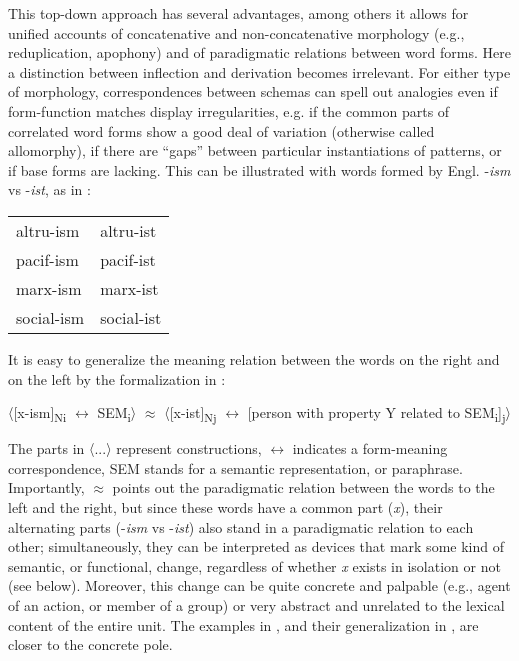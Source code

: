 \documentclass[output=paper]{langscibook}
\begin{document}
This top-down approach has several advantages, among others it allows for unified accounts of concatenative and non-concatenative morphology (e.g., reduplication, apophony) and of paradigmatic relations between word forms. Here a distinction between inflection and derivation becomes irrelevant. For either type of morphology, correspondences between schemas can spell out analogies even if form-function matches display irregularities, e.g. if the common parts of correlated word forms show a good deal of variation (otherwise called allomorphy), if there are “gaps” between particular instantiations of patterns, or if base forms are lacking. This can be illustrated with words formed by Engl. -\textit{ism} vs -\textit{ist}, as in :

\begin{exe} 
 \ex \label{ex:wiemer:19}
 \begin{tabular}[t]{@{}l@{\hskip 2em}l@{}} 
    altru-ism  & altru-ist\\
    pacif-ism  & pacif-ist\\
    marx-ism   & marx-ist\\
    social-ism & social-ist
  \end{tabular}
\end{exe}

It is easy to generalize the meaning relation between the words on the right and on the left by the formalization in :

\begin{exe} 
    \ex \label{ex:wiemer:20} 
          〈[x-ism]\textsc{\textsubscript{N}}\textsubscript{i} ${\leftrightarrow}$ SEM\textsubscript{i}〉   ${\approx}$   〈[x-ist]\textsubscript{Nj} ${\leftrightarrow}$ [person with property Y related to SEM\textsubscript{i}]\textsubscript{j}〉
\end{exe}

The parts in 〈...〉 represent constructions, ${\leftrightarrow}$ indicates a form-meaning correspondence, SEM stands for a semantic representation, or paraphrase. Importantly, ${\approx}$ points out the paradigmatic relation between the words to the left and the right, but since these words have a common part (\textit{x}), their alternating parts (-\textit{ism} vs -\textit{ist}) also stand in a paradigmatic relation to each other; simultaneously, they can be interpreted as devices that mark some kind of semantic, or functional, change, regardless of whether \textit{x} exists in isolation or not (see below). Moreover, this change can be quite concrete and palpable (e.g., agent of an action, or member of a group) or very abstract and unrelated to the lexical content of the entire unit. The examples in , and their generalization in , are closer to the concrete pole.
\end{document}
